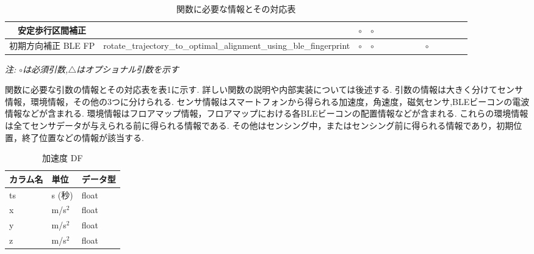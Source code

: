 \begin{table}[ht]
{\begin{tabular}{|c|c|c|c|c|c|c|c|c|c|c|c|c|c|}
			安定歩行区間補正      &                                                        & \multicolumn{1}{c|}{$\circ$} & \multicolumn{1}{c|}{$\circ$} &                              &                              &                              &                                                                                                               &                              &                              &                                  &    &                              &    \\ \hline
			初期方向補正 BLE FP &    rotate\_trajectory\_to\_optimal\_alignment\_using\_ble\_fingerprint
                                                    & \multicolumn{1}{c|}{$\circ$} & \multicolumn{1}{c|}{$\circ$} &                              &                              &                              &                                                                                                               &                              & \multicolumn{1}{c|}{$\circ$} &                                  &    &                              &    \\ \hline
		\end{tabular}
	}
	\caption{関数に必要な情報とその対応表} \label{}
	\textit{注: $\circ$は必須引数,$\triangle$はオプショナル引数を示す} \label{tab:my_label}
\end{table}


関数に必要な引数の情報とその対応表を表1に示す.
詳しい関数の説明や内部実装については後述する.
引数の情報は大きく分けてセンサ情報，環境情報，その他の3つに分けられる.
センサ情報はスマートフォンから得られる加速度，角速度，磁気センサ,BLEビーコンの電波情報などが含まれる.
環境情報はフロアマップ情報，フロアマップにおける各BLEビーコンの配置情報などが含まれる.
これらの環境情報は全てセンサデータが与えられる前に得られる情報である.
その他はセンシング中，またはセンシング前に得られる情報であり，初期位置，終了位置などの情報が該当する.


\begin{table}[h]
	\centering
	\begin{tabular}{lll}
		\toprule
		カラム名 & 単位        & データ型  \\
		\midrule
		ts   & s (秒)     & float \\
		x    & m/s\(^2\) & float \\
		y    & m/s\(^2\) & float \\
		z    & m/s\(^2\) & float \\
		\bottomrule
	\end{tabular}
	\caption{加速度 DF}
\end{table}

